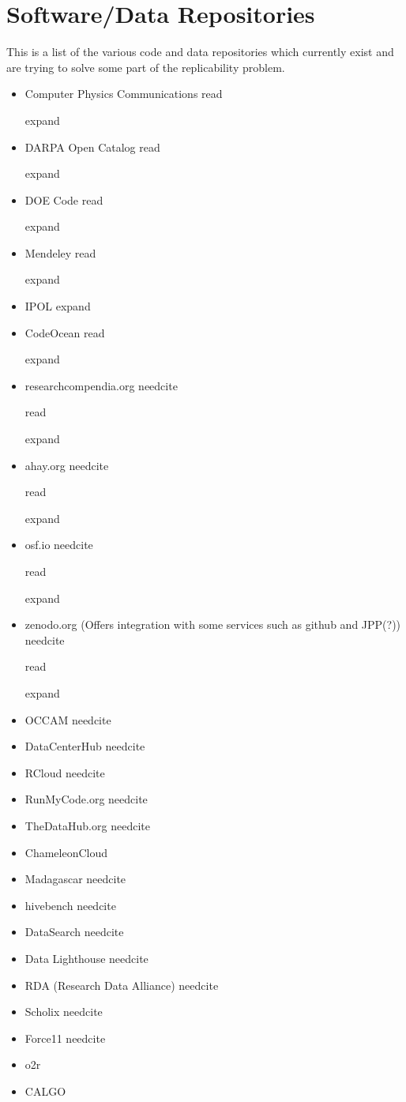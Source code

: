 \documentclass[american]{article}
\newcommand{\Read}{
	\gls{read}
}
\newcommand{\needcite}{
	\gls{needcite}
}
\newcommand{\expand}{
	\gls{expand}
}
\begin{document}

\section{Software/Data Repositories} \label{sec:repositories}

This is a list of the various code and data repositories which currently exist and are trying to solve some part of the replicability problem.

\begin{itemize}
\item Computer Physics Communications \cite{computer-physics-communications} \Read \expand
\item DARPA Open Catalog \cite{darpa-open-catalog} \Read \expand
\item DOE Code \cite{doe-code} \Read \expand
\item Mendeley \cite{elsevier-mendeley-computer-physics-communications} \Read \expand
\item IPOL \cite{ipol-website} \expand
\item CodeOcean \cite{codeocean-live} \Read \expand
\item researchcompendia.org \needcite \Read \expand
\item ahay.org \needcite \Read \expand
\item osf.io \needcite \Read \expand
\item zenodo.org (Offers integration with some services such as github and JPP(?)) \needcite \Read \expand
\item OCCAM \needcite
\item DataCenterHub \needcite
\item RCloud \needcite
\item RunMyCode.org \needcite
\item TheDataHub.org \needcite
\item ChameleonCloud \cite{chameleon-cloud}
\item Madagascar \needcite
\item hivebench \needcite
\item DataSearch \needcite
\item Data Lighthouse \needcite
\item RDA (Research Data Alliance) \needcite
\item Scholix \needcite
\item Force11 \needcite
\item o2r \cite{o2r-platform}
\item CALGO \cite{calgo}
\end{itemize}
\end{document}
